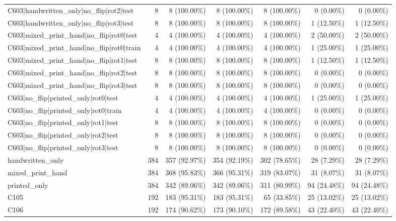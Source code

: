 \begin{longtable}{>{\raggedright\arraybackslash}p{5cm}rrrrrr}
C603|handwritten\_only|no\_flip|rot2|test & 8 & 8 (100.00\%) & 8 (100.00\%) & 8 (100.00\%) & 0 (0.00\%) & 0 (0.00\%) \\
C603|handwritten\_only|no\_flip|rot3|test & 8 & 8 (100.00\%) & 8 (100.00\%) & 8 (100.00\%) & 1 (12.50\%) & 1 (12.50\%) \\
C603|mixed\_print\_hand|no\_flip|rot0|test & 4 & 4 (100.00\%) & 4 (100.00\%) & 4 (100.00\%) & 2 (50.00\%) & 2 (50.00\%) \\
C603|mixed\_print\_hand|no\_flip|rot0|train & 4 & 4 (100.00\%) & 4 (100.00\%) & 4 (100.00\%) & 1 (25.00\%) & 1 (25.00\%) \\
C603|mixed\_print\_hand|no\_flip|rot1|test & 8 & 8 (100.00\%) & 8 (100.00\%) & 8 (100.00\%) & 1 (12.50\%) & 1 (12.50\%) \\
C603|mixed\_print\_hand|no\_flip|rot2|test & 8 & 8 (100.00\%) & 8 (100.00\%) & 8 (100.00\%) & 0 (0.00\%) & 0 (0.00\%) \\
C603|mixed\_print\_hand|no\_flip|rot3|test & 8 & 8 (100.00\%) & 8 (100.00\%) & 8 (100.00\%) & 0 (0.00\%) & 0 (0.00\%) \\
C603|no\_flip|printed\_only|rot0|test & 4 & 4 (100.00\%) & 4 (100.00\%) & 4 (100.00\%) & 1 (25.00\%) & 1 (25.00\%) \\
C603|no\_flip|printed\_only|rot0|train & 4 & 4 (100.00\%) & 4 (100.00\%) & 4 (100.00\%) & 0 (0.00\%) & 0 (0.00\%) \\
C603|no\_flip|printed\_only|rot1|test & 8 & 8 (100.00\%) & 8 (100.00\%) & 8 (100.00\%) & 0 (0.00\%) & 0 (0.00\%) \\
C603|no\_flip|printed\_only|rot2|test & 8 & 8 (100.00\%) & 8 (100.00\%) & 8 (100.00\%) & 0 (0.00\%) & 0 (0.00\%) \\
C603|no\_flip|printed\_only|rot3|test & 8 & 8 (100.00\%) & 8 (100.00\%) & 8 (100.00\%) & 0 (0.00\%) & 0 (0.00\%) \\
handwritten\_only & 384 & 357 (92.97\%) & 354 (92.19\%) & 302 (78.65\%) & 28 (7.29\%) & 28 (7.29\%) \\
mixed\_print\_hand & 384 & 368 (95.83\%) & 366 (95.31\%) & 319 (83.07\%) & 31 (8.07\%) & 31 (8.07\%) \\
printed\_only & 384 & 342 (89.06\%) & 342 (89.06\%) & 311 (80.99\%) & 94 (24.48\%) & 94 (24.48\%) \\
C105 & 192 & 183 (95.31\%) & 183 (95.31\%) & 65 (33.85\%) & 25 (13.02\%) & 25 (13.02\%) \\
C106 & 192 & 174 (90.62\%) & 173 (90.10\%) & 172 (89.58\%) & 43 (22.40\%) & 43 (22.40\%) \\

\end{longtable}
